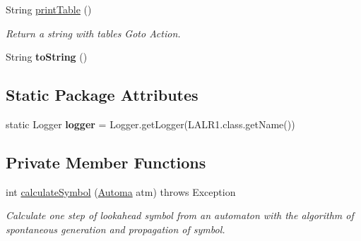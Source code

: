 \begin{DoxyCompactItemize}
\item 
String \hyperlink{classcontext_free_1_1parser_1_1_l_a_l_r1_ad7628eb817b4a8efff71f6e22cc1659f}{print\-Table} ()
\begin{DoxyCompactList}\small\item\em Return a string with tables Goto Action. \end{DoxyCompactList}\item 
\hypertarget{classcontext_free_1_1parser_1_1_l_a_l_r1_afa3cc07b08ecbe69486105beb311eb69}{String {\bfseries to\-String} ()}\label{classcontext_free_1_1parser_1_1_l_a_l_r1_afa3cc07b08ecbe69486105beb311eb69}

\end{DoxyCompactItemize}
\subsection*{Static Package Attributes}
\begin{DoxyCompactItemize}
\item 
\hypertarget{classcontext_free_1_1parser_1_1_l_a_l_r1_a9684757c9b143a5b82609c1de472400e}{static Logger {\bfseries logger} = Logger.\-get\-Logger(L\-A\-L\-R1.\-class.\-get\-Name())}\label{classcontext_free_1_1parser_1_1_l_a_l_r1_a9684757c9b143a5b82609c1de472400e}

\end{DoxyCompactItemize}
\subsection*{Private Member Functions}
\begin{DoxyCompactItemize}
\item 
int \hyperlink{classcontext_free_1_1parser_1_1_l_a_l_r1_aeec32b5c83e031225114f46ac377f804}{calculate\-Symbol} (\hyperlink{classcontext_free_1_1parser_1_1_automa}{Automa} atm)  throws Exception
\begin{DoxyCompactList}\small\item\em Calculate one step of lookahead symbol from an automaton with the algorithm of spontaneous generation and propagation of symbol. \end{DoxyCompactList}\end{DoxyCompactItemize}
